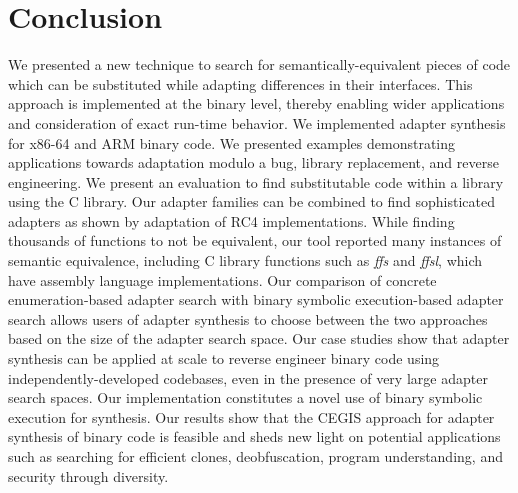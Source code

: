 \section{Conclusion}\label{sec:conclusion}
%
We presented a new technique to search for semantically-equivalent pieces of code which can be substituted while adapting differences in their interfaces.
%
This approach is implemented at the binary level, thereby enabling wider applications and consideration of exact run-time behavior.
%
We implemented adapter synthesis for x86-64 and ARM binary code.
%
We presented examples demonstrating applications towards adaptation modulo a bug, library replacement, and reverse engineering. 
%
We present an evaluation to find substitutable code within a library using the C library.
%
Our adapter families can be combined to find sophisticated adapters as shown by adaptation of RC4 implementations.
%
While finding thousands of functions to not be equivalent, our tool reported many instances of semantic equivalence, including C library functions such as \textit{ffs} and \textit{ffsl}, which have assembly language implementations.
%
Our comparison of concrete enumeration-based adapter search with binary
symbolic execution-based adapter search allows users of adapter
synthesis to choose between the two approaches based on the size of the adapter search space.
%
Our case studies show that adapter synthesis can be applied at scale to reverse engineer binary code using independently-developed codebases, even in the presence of very large adapter search spaces. 
%
Our implementation constitutes a novel use of  binary symbolic execution for synthesis.
%
Our results show that the CEGIS approach for adapter synthesis of binary code is feasible and sheds new light on potential applications such as searching for efficient clones, deobfuscation, program understanding, and security through diversity.
%

